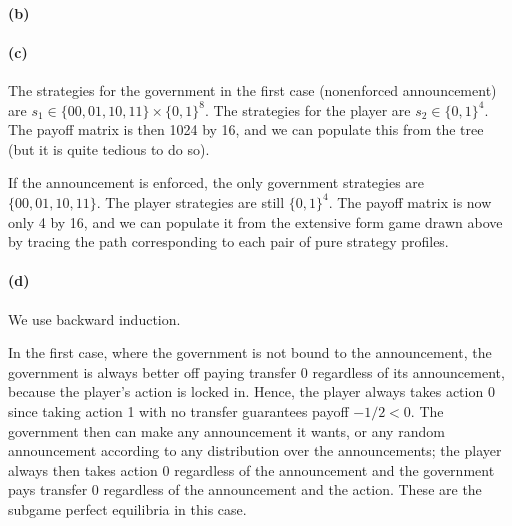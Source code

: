 \documentclass[10pt,letter]{article}
\begin{document}
\paragraph{(b)}

\paragraph{(c)}
The strategies for the government in the first case (nonenforced announcement) are $s_1 \in \{00, 01, 10, 11 \} \times \{ 0, 1 \}^8$. The strategies for the player are $s_2 \in \{ 0, 1 \}^4$. The payoff matrix is then 1024 by 16, and we can populate this from the tree (but it is quite tedious to do so).

If the announcement is enforced, the only government strategies are $\{00, 01, 10, 11 \}$. The player strategies are still $\{ 0, 1 \}^4$. The payoff matrix is now only 4 by 16, and we can populate it from the extensive form game drawn above by tracing the path corresponding to each pair of pure strategy profiles.

\paragraph{(d)}
We use backward induction.

In the first case, where the government is not bound to the announcement, the government is always better off paying transfer 0 regardless of its announcement, because the player's action is locked in. Hence, the player always takes action 0 since taking action 1 with no transfer guarantees payoff $-1/2 < 0$. The government then can make any announcement it wants, or any random announcement according to any distribution over the announcements; the player always then takes action 0 regardless of the announcement and the government pays transfer 0 regardless of the announcement and the action. These are the subgame perfect equilibria in this case.
\end{document}
